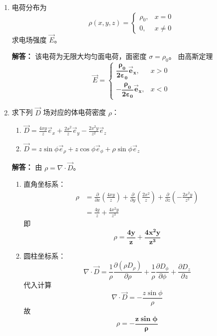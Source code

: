 \begin{enumerate}[label=\arabic*.]
\item 电荷分布为
\[
\rho(x,y,z)=
\begin{cases}
\rho_0, & x=0\\
0, & x\neq 0
\end{cases}
\]
求电场强度 \(\vec{E}\)。

\textbf{解答：}
该电荷为无限大均匀面电荷，面密度 \(\sigma=\rho_0\)。
由高斯定理
\[
\vec{E}=
\begin{cases}
\boldsymbol{\dfrac{\rho_0}{2\varepsilon_0}\vec{e}_x}, & x>0\\[6pt]
\boldsymbol{-\dfrac{\rho_0}{2\varepsilon_0}\vec{e}_x}, & x<0
\end{cases}
\]

\vspace{1em}

\item 求下列 \(\vec{D}\) 场对应的体电荷密度 \(\rho\)：
\begin{enumerate}[label=(\arabic*)]
    \item \(\displaystyle \vec{D}=\frac{4xy}{z}\vec{e}_x+\frac{2x^2}{z}\vec{e}_y-\frac{2x^2y}{z^2}\vec{e}_z\)
    \item \(\displaystyle \vec{D}=z\sin\phi\vec{e}_\rho+z\cos\phi\vec{e}_\phi+\rho\sin\phi\vec{e}_z\)
\end{enumerate}

\textbf{解答：}
由 \(\rho=\nabla\cdot\vec{D}\)。

\begin{enumerate}[label=(\arabic*)]
    \item 直角坐标系：
    \[
    \begin{aligned}
    \rho&=\frac{\partial}{\partial x}\!\left(\frac{4xy}{z}\right)
    +\frac{\partial}{\partial y}\!\left(\frac{2x^2}{z}\right)
    +\frac{\partial}{\partial z}\!\left(-\frac{2x^2y}{z^2}\right)\\[4pt]
    &=\frac{4y}{z}+\frac{4x^2y}{z^3}
    \end{aligned}
    \]
    即
    \[
    \rho=\boldsymbol{\frac{4y}{z}+\frac{4x^2y}{z^3}}
    \]

    \item 圆柱坐标系：
    \[
    \nabla\cdot\vec{D}=
    \frac{1}{\rho}\frac{\partial(\rho D_\rho)}{\partial\rho}
    +\frac{1}{\rho}\frac{\partial D_\phi}{\partial\phi}
    +\frac{\partial D_z}{\partial z}
    \]
    代入计算
    \[
    \nabla\cdot\vec{D}= -\frac{z\sin\phi}{\rho}
    \]
    故
    \[
    \rho=\boldsymbol{-\frac{z\sin\phi}{\rho}}
    \]
\end{enumerate}


\end{enumerate}
